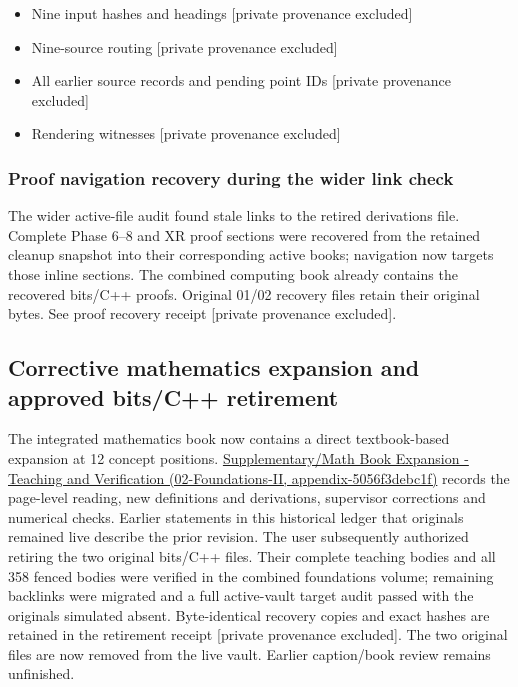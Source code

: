 \begin{itemize}
\tightlist
\item
  {Nine input hashes and headings {[}private provenance excluded{]}}
\item
  {Nine-source routing {[}private provenance excluded{]}}
\item
  {All earlier source records and pending point IDs {[}private provenance excluded{]}}
\item
  {Rendering witnesses {[}private provenance excluded{]}}
\end{itemize}

\subsubsection{Proof navigation recovery during the wider link check}\label{appendix-3b67654799a2-proof-navigation-recovery-during-the-wider-link-check}

The wider active-file audit found stale links to the retired derivations file. Complete Phase 6--8 and XR proof sections were recovered from the retained cleanup snapshot into their corresponding active books; navigation now targets those inline sections. The combined computing book already contains the recovered bits/C++ proofs. Original 01/02 recovery files retain their original bytes. See {proof recovery receipt {[}private provenance excluded{]}}.

\subsection{Corrective mathematics expansion and approved bits/C++ retirement}\label{appendix-3b67654799a2-corrective-mathematics-expansion-and-approved-bitsc-retirement}

The integrated mathematics book now contains a direct textbook-based expansion at 12 concept positions. \href{../02-Foundations-II/main.pdf\#nameddest=appendix-5056f3debc1f}{Supplementary/Math Book Expansion - Teaching and Verification (02-Foundations-II, appendix-5056f3debc1f)} records the page-level reading, new definitions and derivations, supervisor corrections and numerical checks. Earlier statements in this historical ledger that originals remained live describe the prior revision. The user subsequently authorized retiring the two original bits/C++ files. Their complete teaching bodies and all 358 fenced bodies were verified in the combined foundations volume; remaining backlinks were migrated and a full active-vault target audit passed with the originals simulated absent. Byte-identical recovery copies and exact hashes are retained in the {retirement receipt {[}private provenance excluded{]}}. The two original files are now removed from the live vault. Earlier caption/book review remains unfinished.


